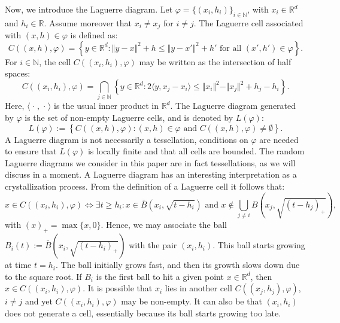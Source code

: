 \documentclass{article}
\newcommand{\NN}{\mathbb{N}}
\newcommand{\RR}{\mathbb{R}}
\newcommand{\blank}{{\mspace{2mu}\cdot\mspace{2mu}}}
\theoremstyle{plain}
\theoremstyle{remark}
\theoremstyle{definition}
\begin{document}
Now, we introduce the Laguerre diagram. Let $\varphi = \{(x_i,h_i)\}_{i \in \NN}$, with $x_i \in \RR^d$ and $h_i \in \RR$. Assume moreover that $x_i \neq x_j$ for $i\neq j$. The Laguerre cell associated with $(x,h) \in \varphi$ is defined as:
\begin{equation}
    C((x,h), \varphi) = \left\{y \in \RR^d: \Vert y-x \Vert^2 + h \leq \Vert y-x' \Vert^2 + h' \text{ for all } (x',h') \in \varphi\right\}. \label{eq_Laguerre_cell_def}
\end{equation}
For $i \in \NN$, the cell $C((x_i,h_i),\varphi)$ may be written as the intersection of half spaces:
\begin{equation}
    C((x_i,h_i),\varphi) = \bigcap_{j \in \NN}\left\{y\in\RR^d: 2\langle y,x_j - x_i\rangle \leq \Vert x_i \Vert^2 - \Vert x_j \Vert^2 +h_j - h_i\right\}. \label{laguerre_cel_halfspaces}
\end{equation}
Here, $\langle \blank,\blank\rangle$ is the usual inner product in $\RR^d$. The Laguerre diagram generated by $\varphi$ is the set of non-empty Laguerre cells, and is denoted by $L(\varphi)$: 
\[L(\varphi) := \left\{C((x,h), \varphi): (x,h) \in \varphi \text{ and } C((x,h), \varphi) \neq \emptyset\right\}.\]
A Laguerre diagram is not necessarily a tessellation, conditions on $\varphi$ are needed to ensure that $L(\varphi)$ is locally finite and that all cells are bounded. The random Laguerre diagrams we consider in this paper are in fact tessellations, as we will discuss in a moment. A Laguerre diagram has an interesting interpretation as a crystallization process. From the definition of a Laguerre cell it follows that:
\[x \in C((x_i,h_i),\varphi) \iff \exists t \geq h_i: x \in \bar{B}\left(x_i,\sqrt{t - h_i}\right) \text{ and } x \notin \bigcup_{j \neq i} B\left(x_j, \sqrt{(t-h_j)_{+}}\right),\]
with $(x)_{+} = \max\{x, 0\}$. Hence, we may associate the ball $B_i(t) := \bar{B}(x_i, \sqrt{(t-h_i)_{+}})$ with the pair $(x_i,h_i)$. This ball starts growing at time $t = h_i$. The ball initially grows fast, and then its growth slows down due to the square root. If $B_i$ is the first ball to hit a given point $x \in \RR^d$, then $x \in C((x_i,h_i),\varphi)$. It is possible that $x_i$ lies in another cell $C((x_j,h_j),\varphi)$, $i\neq j$ and yet $C((x_i,h_i),\varphi)$ may be non-empty. It can also be that $(x_i,h_i)$ does not generate a cell, essentially because its ball starts growing too late. 
\end{document}
